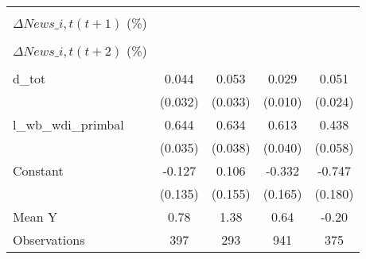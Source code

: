 {\begin{tabular}{l*{4}{c}}
                    &                     &                     &                     &                     \\
\addlinespace
$ \Delta News\_{i,t}(t+1)$ (\%)&                     &                     &                     &                     \\
                    &                     &                     &                     &                     \\
\addlinespace
$ \Delta News\_{i,t}(t+2)$ (\%)&                     &                     &                     &                     \\
                    &                     &                     &                     &                     \\
\addlinespace
d\_tot               &       0.044         &       0.053         &       0.029\sym{***}&       0.051\sym{**} \\
                    &     (0.032)         &     (0.033)         &     (0.010)         &     (0.024)         \\
\addlinespace
l\_wb\_wdi\_primbal    &       0.644\sym{***}&       0.634\sym{***}&       0.613\sym{***}&       0.438\sym{***}\\
                    &     (0.035)         &     (0.038)         &     (0.040)         &     (0.058)         \\
\addlinespace
Constant            &      -0.127         &       0.106         &      -0.332\sym{*}  &      -0.747\sym{***}\\
                    &     (0.135)         &     (0.155)         &     (0.165)         &     (0.180)         \\
\midrule
Mean Y              &        0.78         &        1.38         &        0.64         &       -0.20         \\
Observations        &         397         &         293         &         941         &         375         \\
\bottomrule
\end{tabular}
}
